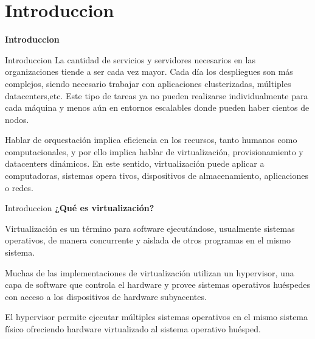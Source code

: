 \section{Introduccion}

\begin{frame}
    \Huge
    \centering
    \textbf{ Introduccion }

\end{frame}


\begin{frame}{Introduccion}
    \vspace{-1.5cm}
    La cantidad de servicios y servidores necesarios en las organizaciones tiende a ser cada vez mayor.
    Cada día los despliegues son más complejos, siendo necesario trabajar con aplicaciones clusterizadas, múltiples datacenters,etc.
    Este tipo de tareas ya no pueden realizarse individualmente para cada máquina y menos aún en entornos escalables donde pueden haber cientos de nodos.

    \begin{block}{}
        Hablar de orquestación implica eficiencia en los recursos, tanto humanos como computacionales, y por ello implica hablar de virtualización, provisionamiento y datacenters dinámicos. En este sentido, virtualización puede aplicar a computadoras, sistemas opera
        tivos, dispositivos de almacenamiento, aplicaciones o redes.
    \end{block}

\end{frame}

\begin{frame}{Introduccion}
    \vspace{-1.5cm}
    \textbf{¿Qué es virtualización?}

    Virtualización es un término para software ejecutándose, usualmente sistemas operativos, de manera concurrente y aislada de otros programas en el mismo sistema. 

    \begin{block}{}
        Muchas de las implementaciones de virtualización utilizan un hypervisor, una capa de software que controla el hardware y provee sistemas operativos huéspedes con acceso a los dispositivos de hardware subyacentes. 
    \end{block}

    \begin{block}{}
        El hypervisor permite ejecutar múltiples sistemas operativos en el mismo sistema físico ofreciendo hardware virtualizado al sistema operativo huésped.
    \end{block}

\end{frame}

